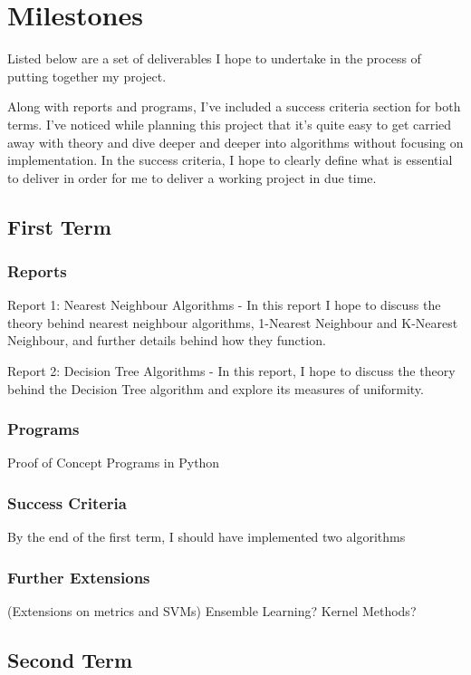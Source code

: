 \documentclass[letterpaper,11pt]{article}
\begin{document}
\newpage
\section{Milestones}
Listed below are a set of deliverables I hope to undertake in the process of putting together my project. \par 
Along with reports and programs, I've included a success criteria section for both terms. I've noticed while planning this project that it's quite easy to get carried away with theory and dive deeper and deeper into algorithms without focusing on implementation. In the success criteria, I hope to clearly define what is essential to deliver in order for me to deliver a working project in due time. 
\subsection{First Term}
\subsubsection{Reports}
Report 1: Nearest Neighbour Algorithms - In this report I hope to discuss the theory behind nearest neighbour algorithms, 1-Nearest Neighbour and K-Nearest Neighbour, and further details behind how they function. \par 
Report 2: Decision Tree Algorithms - In this report, I hope to discuss the theory behind the Decision Tree algorithm and explore its measures of uniformity. \par

\subsubsection{Programs}
Proof of Concept Programs in Python

\subsubsection{Success Criteria}
By the end of the first term, I should have implemented two algorithms
\subsubsection{Further Extensions}
(Extensions on metrics and SVMs) Ensemble Learning? Kernel Methods?

\subsection{Second Term}
\end{document}

